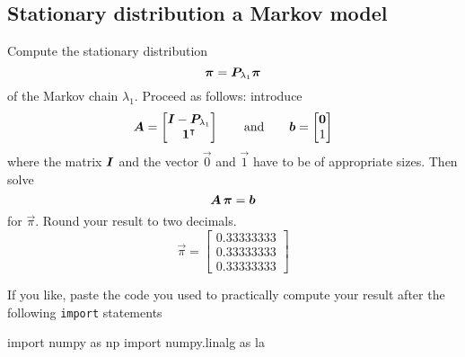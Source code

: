 
\color{black}
\subsection*{Stationary distribution a Markov model}

Compute the stationary distribution
\begin{equation*}
\bm{\pi} = \bm{P}_{\lambda_1} \bm{\pi}
\end{equation*}
of the Markov chain $\lambda_1$. Proceed as follows: introduce 
\begin{equation*}
  \bm{A} = \begin{bmatrix} \bm{I} - \bm{P}_{\lambda_1} \\ \bm{1}^\intercal \end{bmatrix} \qquad \text{and} \qquad 
  \bm{b} = \begin{bmatrix} \bm{0} \\ 1 \end{bmatrix}
\end{equation*}
where the matrix $\bm{I}$ and the vector $\vec{0}$ and $\vec{1}$ have to be of appropriate sizes. Then solve
\begin{equation*}
\bm{A} \, \bm{\pi} = \bm{b}
\end{equation*}
for $\vec{\pi}$. Round your result to two decimals.
\color{blue}
\begin{equation*}
\vec{\pi} = \begin{bmatrix} 0.33333333 \\ 0.33333333 \\ 0.33333333 \end{bmatrix}
\end{equation*}
\color{black}

If you like, paste the code you used to practically compute your result after the following \texttt{import} statements
\color{blue}
\begin{PythonCode}
import numpy as np
import numpy.linalg as la


\end{PythonCode}
\color{black}


